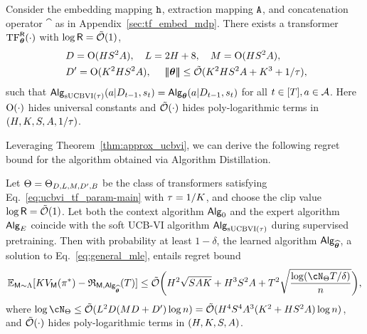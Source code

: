 \begin{theorem}\label{thm:approx_ucbvi}
Consider the embedding mapping ${\tt h}$, extraction mapping ${\tt A}$, and concatenation operator $\cat$ as in Appendix~\ref{sec:tf_embed_mdp}. There exists a transformer ${\rm TF}_{\boldsymbol \theta}^{{\mathsf{R}}}(\cdot)$ with $\log {\mathsf{R}} = {\tilde{\mathcal O}}(1)$, 
\begin{equation}\label{eq:ucbvi_tf_param-main}
\begin{aligned}
&~D ={\mathrm{O}}({H}{S}^2{A}),~~~L= 2{H}+8,~~~M= {\mathrm{O}}({H}{S}^2{A}),\\
&~{D'}= {\mathrm{O}}({K}^2{H}{S}^2{A}),~~~~{\left|\!\left|\!\left|{{\boldsymbol \theta}}\right|\!\right|\!\right|}\leq {\tilde{\mathcal O}}({K}^2{H}{S}^2{A}+{K}^3+1/{\tau}),
\end{aligned} 
\end{equation}
such that 
${\mathsf{Alg}}_{{\mathrm{sUCBVI}}(\tau)}({a}|{D}_{t-1},{s}_t) = {\mathsf{Alg}}_{{{\boldsymbol \theta}}}({a}|{D}_{t-1},{s}_t)$ for all $t\in[T],{a}\in{\mathcal{A}}$. Here ${\mathrm{O}}(\cdot)$ hides universal constants and ${\tilde{\mathcal O}}(\cdot)$  hides poly-logarithmic terms in $({H},{K},{S},{A},1/{\tau})$. 
\end{theorem}

Leveraging Theorem~\ref{thm:approx_ucbvi}, we can derive the following regret bound for the algorithm obtained via Algorithm Distillation. 

\begin{theorem}\label{thm:ucbvi_icrl-main}
Let $\Theta = \Theta_{D, L, M, {D'}, B}$ be the class of transformers satisfying Eq.~\eqref{eq:ucbvi_tf_param-main} with ${\tau} = 1/{K}$, and choose the clip value $\log {\mathsf{R}} = {\tilde{\mathcal O}}(1)$. Let both the context algorithm ${\mathsf{Alg}}_0$ and the expert algorithm ${\mathsf{Alg}}_{E}$ coincide with the soft UCB-VI algorithm ${\mathsf{Alg}}_{{\mathrm{sUCBVI}}(\tau)}$ during supervised pretraining.  Then with probability at least $1-\delta$, the learned algorithm ${\mathsf{Alg}}_{{\widehat{{\boldsymbol \theta}}}}$, a solution to Eq.~\eqref{eq:general_mle}, entails regret bound
\begin{align*}
\E_{\inst\sim\prior}[\Numepi\Vfun_\inst(\plc^*)-\totreward_{\inst,\sAlg_\esttfpar}(\totlen)]\leq \tcO \bigg(\horizon^2\sqrt{\Numst\Numact\Numepi}+\horizon^3\Numst^2\Numact+\totlen^2\sqrt{\frac{\log ( \cN_{\Parspace} \totlen/\delta ) }{n} } \bigg),
\end{align*}
where $\log \cN_{\Parspace} \le \tcO(\layer^2\embd(\head\embd+\hidden) \log\Numobs) = \tcO(\horizon^4\Numst^4\Numact^3(\Numepi^2+\horizon\Numst^2\Numact)\log\Numobs)$, and ${\tilde{\mathcal O}}(\cdot)$ hides poly-logarithmic terms in $({H},{K},{S},{A})$. 
\end{theorem}